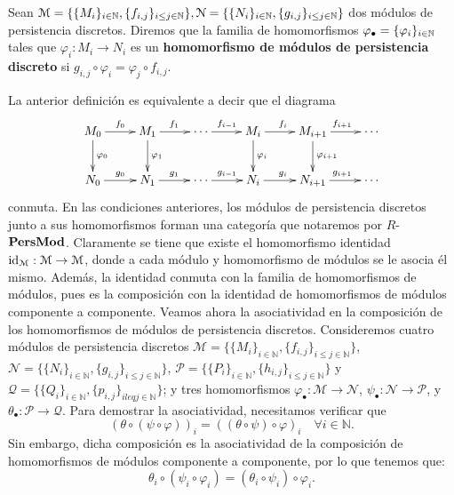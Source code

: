 \begin{definicion}
	Sean \(\mathcal{M} = \{\{M_i\}_{i \in \mathbb{N}}, \{f_{i,j}\}_{i \leq j \in \mathbb{N}}\}, \mathcal{N} = \{\{N_i\}_{i \in \mathbb{N}}, \{g_{i,j}\}_{i \leq j \in \mathbb{N}}\} \) dos módulos de persistencia discretos.  Diremos que la familia de homomorfismos \(\varphi_\bullet = \{\varphi_i\}_{i \in \mathbb{N}}\) tales que \(\varphi_i : M_i \to N_i\) es un \textbf{homomorfismo de módulos de persistencia discreto} si \(g_{i,j} \circ \varphi_i = \varphi_j \circ f_{i,j}\).
\end{definicion}
La anterior definición es equivalente a decir que el diagrama
\[
	\xymatrix{
		M_0 \ar@{->}[r]^{f_0} \ar@{->}[d]^{\varphi_0} & M_1 \ar@{->}[r]^{f_1} \ar@{->}[d]^{\varphi_1} & \cdots \ar@{->}[r]^{f_{i-1}} & M_i \ar@{->}[r]^{f_i} \ar@{->}[d]^{\varphi_i} & M_{i+1} \ar@{->}[r]^{f_{i+1}} \ar@{->}[d]^{\varphi_{i+1}} & \cdots \\
		N_0 \ar@{->}[r]^{g_0} & N_1 \ar@{->}[r]^{g_1} & \cdots \ar@{->}[r]^{g_{i-1}} & N_i \ar@{->}[r]^{g_i} & N_{i+1} \ar@{->}[r]^{g_{i+1}} & \cdots
	}
\]
conmuta. En las condiciones anteriores, los módulos de persistencia discretos junto a sus homomorfismos forman una categoría que notaremos por \(R\)-\(\mathbf{PersMod}\). Claramente se tiene que existe el homomorfismo identidad $\operatorname{id}_\mathcal{M} : \mathcal{M} \to \mathcal{M}$, donde a cada módulo y homomorfismo de módulos se le asocia él mismo. Además, la identidad conmuta con la familia de homomorfismos de módulos, pues es la composición con la identidad de homomorfismos de módulos componente a componente. Veamos ahora la asociatividad en la composición de los homomorfismos de módulos de persistencia discretos. Consideremos cuatro módulos de persistencia discretos $\mathcal{M} = \{\{M_i\}_{i \in \mathbb{N}}, \{f_{i,j}\}_{i \leq j \in \mathbb{N}}\}$,
$\mathcal{N} = \{\{N_i\}_{i \in \mathbb{N}}, \{g_{i,j}\}_{i \leq j \in \mathbb{N}}\}$,
$\mathcal{P} = \{\{P_i\}_{i \in \mathbb{N}}, \{h_{i,j}\}_{i \leq j \in \mathbb{N}}\}$ y
$\mathcal{Q} = \{\{Q_i\}_{i \in \mathbb{N}}, \{p_{i,j}\}_{i leq j \in \mathbb{N}}\}$; y tres homomorfismos \(\varphi_\bullet : \mathcal{M} \to \mathcal{N}\), \(\psi_\bullet : \mathcal{N} \to \mathcal{P}\), y \(\theta_\bullet : \mathcal{P} \to \mathcal{Q}\). Para demostrar la asociatividad, necesitamos verificar que
\[
(\theta \circ (\psi \circ \varphi))_i = ((\theta \circ \psi) \circ \varphi)_i \quad \forall i \in \mathbb{N}.
\]
Sin embargo, dicha composición es la asociatividad de la composición de homomorfismos de módulos componente a componente, por lo que tenemos que:
\[
\theta_i \circ (\psi_i \circ \varphi_i) = (\theta_i \circ \psi_i) \circ \varphi_i.
\]

